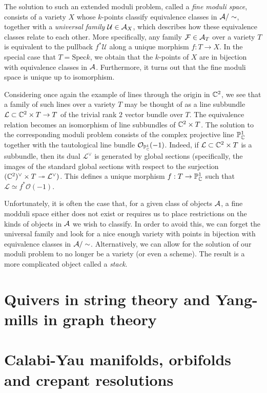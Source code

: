         The solution to such an extended moduli problem, called a \emph{fine moduli space}, consists of a variety $X$ whose $k$-points classify equivalence classes in $\mathcal{A}/\sim$, together with a \emph{universal family} $\mathcal{U}\in\mathcal{A}_X$, which describes how these equivalence classes relate to each other. More specifically, any family $\mathcal{F}\in\mathcal{A}_T$ over a variety $T$ is equivalent to the pullback $f^*\mathcal{U}$ along a unique morphism $f:T\to X$. In the special case that $T=\text{Spec}k$, we obtain that the $k$-points of $X$ are in bijection with equivalence classes in $\mathcal{A}$. Furthermore, it turns out that the fine moduli space is
        unique up to isomorphism. 
        
        Considering once again the example of lines through the origin in $\mathbb{C}^2$, we see that a family of such lines over a variety $T$ may be thought of as a line subbundle $\mathcal{L}\subset\mathbb{C}^2\times T\to T$ of the trivial rank $2$ vector bundle over $T$. The equivalence relation becomes an isomorphism of line subbundles of $\mathbb{C}^2\times T$. The solution to the corresponding moduli problem consists of the complex projective line $\mathbb{P}^1_{\mathbb{C}}$ together with the tautological line bundle $\mathcal{O}_{\mathbb{P}^1_{\mathbb{C}}}(-1)$. Indeed, if $\mathcal{L}\subset\mathbb{C}^2\times T$ is a subbundle, then its dual $\mathcal{L}^\vee$ is generated by global sections (specifically, the images of the standard global sections with respect to the surjection   $(\mathbb{C}^2)^\vee\times T\twoheadrightarrow\mathcal{L}^\vee)$. This defines a unique morphism $f:T\to\mathbb{P}^1_{\mathbb{C}}$ such that $\mathcal{L}\simeq f^*\mathcal{O}(-1)$.

        Unfortunately, it is often the case that, for a given class of objects $\mathcal{A}$, a fine modduli space either does not exist or requires us to place restrictions on the kinds of objects in $\mathcal{A}$ we wish to classify. In order to avoid this, we can forget the universal family and look for a nice enough variety with points in bijection with equivalence classes in $\mathcal{A}/\sim$. Alternatively, we can allow for the solution of our moduli problem to no longer be a variety (or even a scheme). The result is a more complicated object called a \emph{stack}.



\section{Quivers in string theory and Yang-mills in graph theory}

\section{Calabi-Yau manifolds, orbifolds and crepant resolutions}\label{sec:CY}

